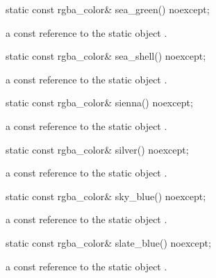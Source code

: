 \begin{itemdecl}
static const rgba_color& sea_green() noexcept;
\end{itemdecl}
\begin{itemdescr}
\pnum
\returns
a const reference to the static  object .
\end{itemdescr}

\begin{itemdecl}
static const rgba_color& sea_shell() noexcept;
\end{itemdecl}
\begin{itemdescr}
\pnum
\returns
a const reference to the static  object .
\end{itemdescr}

\begin{itemdecl}
static const rgba_color& sienna() noexcept;
\end{itemdecl}
\begin{itemdescr}
\pnum
\returns
a const reference to the static  object .
\end{itemdescr}

\begin{itemdecl}
static const rgba_color& silver() noexcept;
\end{itemdecl}
\begin{itemdescr}
\pnum
\returns
a const reference to the static  object .
\end{itemdescr}

\begin{itemdecl}
static const rgba_color& sky_blue() noexcept;
\end{itemdecl}
\begin{itemdescr}
\pnum
\returns
a const reference to the static  object .
\end{itemdescr}

\begin{itemdecl}
static const rgba_color& slate_blue() noexcept;
\end{itemdecl}
\begin{itemdescr}
\pnum
\returns
a const reference to the static  object .
\end{itemdescr}

